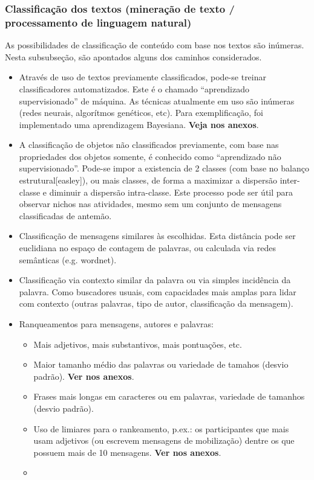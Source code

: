 \documentclass[12pt]{article}
\begin{document}
\subsubsection{Classificação dos textos (mineração de texto / processamento de linguagem natural)}
As possibilidades de classificação de conteúdo com base nos textos são inúmeras. Nesta subsubseção, são apontados alguns dos caminhos considerados.
\begin{itemize}
    \item Através de uso de textos previamente classificados, pode-se treinar classificadores automatizados. Este é o chamado “aprendizado supervisionado” de máquina. As técnicas atualmente em uso são inúmeras (redes neurais, algorítmos genéticos, etc). Para  exemplificação, foi implementado uma aprendizagem Bayesiana. {\bf Veja nos anexos}.
    \item A classificação de objetos não classificados previamente, com base nas propriedades dos objetos somente, é conhecido como “aprendizado não supervisionado”. Pode-se impor a existencia de 2 classes (com base no balanço estrutural[easley]), ou mais classes, de forma a maximizar a dispersão inter-classe e diminuir a dispersão intra-classe. Este processo pode ser útil para observar nichos nas atividades, mesmo sem um conjunto de mensagens classificadas de antemão.
    \item Classificação de mensagens similares às escolhidas. Esta distância pode ser euclidiana no espaço de contagem de palavras, ou calculada via redes semânticas (e.g. wordnet).
    \item Classificação via contexto similar da palavra ou via simples incidência da palavra. Como buscadores usuais, com capacidades mais amplas para lidar com contexto (outras palavras, tipo de autor, classificação da mensagem).
    \item Ranqueamentos para mensagens, autores e palavras:
\begin{itemize}
        \item Mais adjetivos, mais substantivos, mais pontuações, etc. 
        \item Maior tamanho médio das palavras ou variedade de tamahos (desvio padrão). {\bf Ver nos anexos}.
        \item Frases mais longas em caracteres ou em palavras, variedade de tamanhos (desvio padrão).
        \item Uso de limiares para o rankeamento, p.ex.: os participantes que mais usam adjetivos (ou escrevem mensagens de mobilização) dentre os que possuem mais de 10 mensagens. {\bf Ver nos anexos}.
        \item 
\end{itemize}
\end{itemize}
\end{document}
